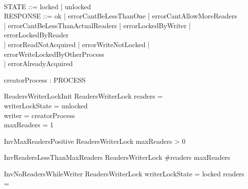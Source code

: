 \documentclass{article}
\begin{document}
\begin{zed}
[PROCESS] \\
\also
STATE ::= locked | unlocked\\
\also
RESPONSE ::= ok | errorCantBeLessThanOne | errorCantAllowMoreReaders \\ 
| errorCantBeLessThanActualReaders | errorLockedByWriter | errorLockedByReader \\
| errorReadNotAcquired | errorWriteNotLocked | errorWriteLockedByOtherProcess \\
| errorAlreadyAcquired  
\end{zed}

\begin{axdef}
creatorProcess : PROCESS
\end{axdef}


\begin{schema}{ReadersWriterLockInit}
    ReadersWriterLock
\where
    readers = \emptyset \\
    writerLockState = unlocked \\
    writer = creatorProcess \\
    maxReaders = 1
\end{schema}

\begin{schema}{InvMaxReadersPositive}
    ReadersWriterLock
\where
    maxReaders > 0
\end{schema}

\begin{schema}{InvReadersLessThanMaxReaders}
    ReadersWriterLock
\where
    \#readers \leq maxReaders
\end{schema}

\begin{schema}{InvNoReadersWhileWriter}
    ReadersWriterLock
\where
    writerLockState = locked \implies readers = \emptyset
\end{schema}

\end{document}
